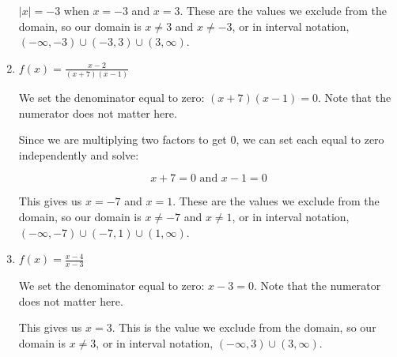 \documentclass{ximera}
\begin{document}
\begin{enumerate}
\begin{example}
\begin{explanation}
\begin{expandable}
$|x| = -3$ when $x = -3$ and $x = 3$. These are the values we exclude from the domain, so our domain is $x \ne 3$ and $x \ne -3$, or in interval notation, $(-\infty, -3) \cup (-3, 3) \cup (3, \infty)$. 
			\end{expandable}
		\end{explanation}
		\end{example}
	\item \begin{example}

$f(x) = \frac{x - 2}{(x + 7)(x - 1)}$
		\begin{explanation}
			\begin{expandable}

We set the denominator equal to zero: $(x + 7)(x - 1) = 0$. Note that the numerator does not matter here. 

Since we are multiplying two factors to get 0, we can set each equal to zero independently and solve: 

$$x + 7 = 0 \text{ and } x - 1 = 0$$

This gives us $x = -7$ and $x = 1$. These are the values we exclude from the domain, so our domain is $x \ne -7$ and $x \ne 1$, or in interval notation, $(-\infty, -7) \cup (-7, 1) \cup (1, \infty)$. 
			\end{expandable}
		\end{explanation}
		\end{example}
	\item \begin{example}

$f(x) = \frac{x - 4}{x - 3}$
		\begin{explanation}
			\begin{expandable}

We set the denominator equal to zero: $x - 3 = 0$. Note that the numerator does not matter here. 

This gives us $x = 3$. This is the value we exclude from the domain, so our domain is $x \ne 3$, or in interval notation, $(-\infty, 3) \cup (3, \infty)$.
			\end{expandable} 
		\end{explanation}
		\end{example}
\end{enumerate}



\end{document}
